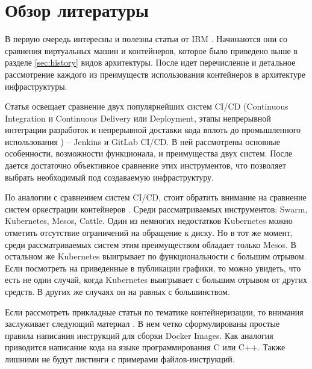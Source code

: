 \section{Обзор литературы}
\label{sec:lit-rev}

В первую очередь интересны и полезны статьи от IBM \cite{ibm:containers1}\cite{ibm:containers2}. Начинаются они со сравнения виртуальных машин и контейнеров, которое было приведено выше в разделе \ref{sec:history} видов архитектуры. После идет перечисление и детальное рассмотрение каждого из преимуществ использования контейнеров в архитектуре инфраструктуры.

Статья \cite{habr:ruvds:jenkins-vs-gitlab} освещает сравнение двух популярнейших систем CI/CD (Continuous Integration и Continuous Delivery или Deployment, этапы непрерывной интеграции разработок и непрерывной доставки кода вплоть до промышленного использования \cite{habr:flant:k8s-and-gitlab})
-- Jenkins и GitLab CI/CD. В ней рассмотрены основные особенности, возможности функционала, и преимущества двух систем. После дается достаточно объективное сравнение этих инструментов, что позволяет выбрать необходимый под создаваемую инфраструктуру.

По аналогии с сравнением систем CI/CD, стоит обратить внимание на сравнение систем оркестрации контейнеров \cite{al2019container}. Среди рассматриваемых инструментов: Swarm, Kubernetes, Mesos, Cattle. Один из немногих недостатков Kubernetes можно отметить отсутствие ограничений на обращение к диску. Но в тот же момент, среди рассматриваемых систем этим преимуществом обладает только Mesos. В остальном же Kubernetes выигрывает по функциональности с большим отрывом. Если посмотреть на приведенные в публикации графики, то можно увидеть, что есть не один случай, когда Kubernetes выигрывает с большим отрывом от других средств. В других же случаях он на равных с большинством.

Если рассмотреть прикладные статьи по тематике контейнеризации, то внимания заслуживает следующий материал \cite{nust2020ten}. В нем четко сформулированы простые правила написания инструкций для сборки Docker Images. Как аналогия приводится написание кода на языке программирования C или C++. Также лишними не будут листинги с примерами файлов-инструкций.

